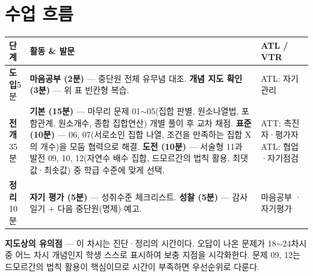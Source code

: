 \documentclass[11pt,a4paper]{article}
\begin{document}
\section{수업 흐름}
\begin{tabularx}{\linewidth}{@{}>{\centering\arraybackslash}p{1.6cm}X>{\raggedright\arraybackslash\small}p{3.1cm}@{}}
\toprule
\textbf{단계} & \textbf{활동 \& 발문} & \textbf{ATL / VTR} \\
\midrule
\textcolor{goldstrong}{\textbf{도입}}\newline\footnotesize 5분 &
\textbf{마음공부 (2분)} --- 중단원 전체 유무념 대조.\newline
\textbf{개념 지도 확인 (3분)} --- 위 표 빈칸형 복습. &
ATL: 자기관리 \\
\addlinespace
\textcolor{goldstrong}{\textbf{전개}}\newline\footnotesize 35분 &
\textbf{기본 (15분)} --- 마무리 문제 01$\sim$05(집합 판별, 원소나열법, 포함관계, 원소개수, 종합 집합연산) 개별 풀이 후 교차 채점.\newline
\textbf{표준 (10분)} --- 06, 07(서로소인 집합 나열, 조건을 만족하는 집합 X의 개수)을 모둠 협력으로 해결.\newline
\textbf{도전 (10분)} --- 서술형 11과 발전 09, 10, 12(자연수 배수 집합, 드모르간의 법칙 활용, 최댓값·최솟값) 중 학급 수준에 맞게 선택. &
ATT: 촉진자·평가자\newline ATL: 협업·자기점검 \\
\addlinespace
\textcolor{goldstrong}{\textbf{정리}}\newline\footnotesize 10분 &
\textbf{자기 평가 (5분)} --- 성취수준 체크리스트.\newline
\textbf{성찰 (5분)} --- 감사 일기 + 다음 중단원(명제) 예고. &
마음공부 · 자기평가 \\
\bottomrule
\end{tabularx}

\begin{calloutbox}
\textbf{지도상의 유의점} --- 이 차시는 진단·정리의 시간이다. 오답이 나온 문제가 18$\sim$24차시 중 어느 차시 개념인지 학생 스스로 표시하여 보충 지점을 시각화한다. 문제 09, 12는 드모르간의 법칙 활용이 핵심이므로 시간이 부족하면 우선순위로 다룬다.
\end{calloutbox}
\end{document}
